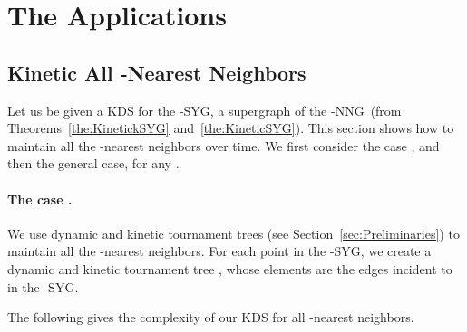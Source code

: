 \documentclass[preprint,12pt]{elsarticle}
\def\knng{\mbox{-NNG}}
\def\ksyg{\mbox{-SYG}}
\def\1syg{\mbox{-SYG}}
\begin{document}
\section{The Applications}\label{sec:applications}
\subsection{Kinetic All -Nearest Neighbors}\label{sec:app_kNNs}
Let us be given a KDS for the \ksyg, a supergraph of the \knng~(from Theorems~\ref{the:KinetickSYG} and~\ref{the:KineticSYG}). This section shows how to maintain all the -nearest neighbors over time. We first consider the case , and then the general case, for any .


\paragraph{The case .}\label{sec:KDSfor1NNs}
We use dynamic and kinetic tournament trees (see Section~\ref{sec:Preliminaries}) to maintain all the -nearest neighbors. For each point  in the \1syg, we create a dynamic and kinetic tournament tree , whose elements are the edges incident to  in the \1syg. 

The following gives the complexity of our KDS for all -nearest neighbors.
\end{document}
